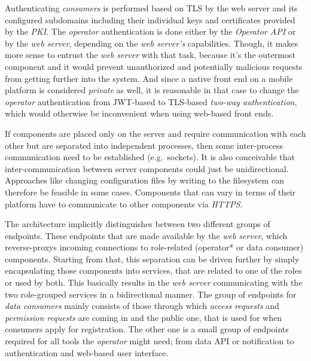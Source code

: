\documentclass[12pt,english,a4paper,titlepage,cleardoublepage=empty,dottedtoc]{report}
\begin{document}
Authenticating \emph{consumers} is performed based on TLS by the web
server and its configured subdomains including their individual keys and
certificates provided by the \emph{PKI}. The \emph{operator}
authentication is done either by the \emph{Operator API} or by the
\emph{web server}, depending on the \emph{web server's} capabilities.
Though, it makes more sense to entrust the \emph{web server} with that
task, because it's the outermost component and it would prevent
unauthorized and potentially malicious requests from getting further
into the system. And since a native front end on a mobile platform is
considered \emph{private} as well, it is reasonable in that case to
change the \emph{operator} authentication from JWT-based to TLS-based
\emph{two-way authentication}, which would otherwise be inconvenient
when using web-based front ends.

If components are placed only on the server and require communication
with each other but are separated into independent processes, then some
inter-process communication need to be established (e.g.~sockets). It is
also conceivable that inter-communication between server components
could just be unidirectional. Approaches like changing configuration
files by writing to the filesystem can therefore be feasible in some
cases. Components that can vary in terms of their platform have to
communicate to other components via \emph{HTTPS}.

The architecture implicitly distinguishes between two different groups
of endpoints. These endpoints that are made available by the \emph{web
server}, which reverse-proxys incoming connections to role-related
(operator* or data consumer) components. Starting from that, this
separation can be driven further by simply encapsulating those
components into services, that are related to one of the roles or used
by both. This basically results in the \emph{web server} communicating
with the two role-grouped services in a bidirectional manner. The group
of endpoints for \emph{data consumers} mainly consists of those through
which \emph{access requests} and \emph{permission requests} are coming
in and the public one, that is used for when consumers apply for
registration. The other one is a small group of endpoints required for
all tools the \emph{operator} might need; from data API or notification
to authentication and web-based user interface.
\end{document}
